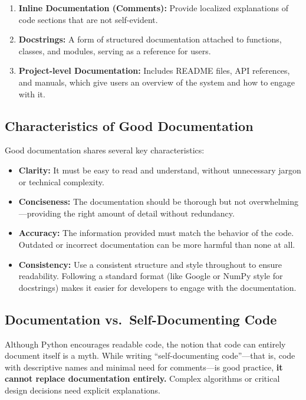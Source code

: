 \documentclass[
  letterpaper,
  DIV=11,
  numbers=noendperiod]{scrreprt}
\providecommand{\tightlist}{%
  \setlength{\itemsep}{0pt}\setlength{\parskip}{0pt}}\usepackage{longtable,booktabs,array}
\begin{document}
\begin{enumerate}
\def\labelenumi{\arabic{enumi}.}
\tightlist
\item
  \textbf{Inline Documentation (Comments):} Provide localized
  explanations of code sections that are not self-evident.
\item
  \textbf{Docstrings:} A form of structured documentation attached to
  functions, classes, and modules, serving as a reference for users.
\item
  \textbf{Project-level Documentation:} Includes README files, API
  references, and manuals, which give users an overview of the system
  and how to engage with it.
\end{enumerate}

\hypertarget{characteristics-of-good-documentation}{%
\subsection{Characteristics of Good
Documentation}\label{characteristics-of-good-documentation}}

Good documentation shares several key characteristics:

\begin{itemize}
\tightlist
\item
  \textbf{Clarity:} It must be easy to read and understand, without
  unnecessary jargon or technical complexity.
\item
  \textbf{Conciseness:} The documentation should be thorough but not
  overwhelming---providing the right amount of detail without
  redundancy.
\item
  \textbf{Accuracy:} The information provided must match the behavior of
  the code. Outdated or incorrect documentation can be more harmful than
  none at all.
\item
  \textbf{Consistency:} Use a consistent structure and style throughout
  to ensure readability. Following a standard format (like Google or
  NumPy style for docstrings) makes it easier for developers to engage
  with the documentation.
\end{itemize}

\hypertarget{documentation-vs.-self-documenting-code}{%
\subsection{Documentation vs.~Self-Documenting
Code}\label{documentation-vs.-self-documenting-code}}

Although Python encourages readable code, the notion that code can
entirely document itself is a myth. While writing ``self-documenting
code''---that is, code with descriptive names and minimal need for
comments---is good practice, \textbf{it cannot replace documentation
entirely.} Complex algorithms or critical design decisions need explicit
explanations.
\end{document}
